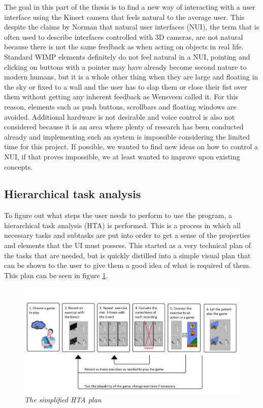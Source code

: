 The goal in this part of the thesis is to find a new way of interacting with a user interface using the Kinect camera that feels natural to the average user. This despite the claims by Norman \cite{Norman2010} that natural user interfaces (NUI), the term that is often used to describe interfaces controlled with 3D cameras, are not natural because there is not the same feedback as when acting on objects in real life. Standard WIMP elements definitely do not feel natural in a NUI, pointing and clicking on buttons with a pointer may have already become second nature to modern humans, but it is a whole other thing when they are large and floating in the sky or fixed to a wall and the user has to slap them or close their fist over them without getting any inherent feedback as Wensveen \cite{Wensveen2004} called it. For this reason, elements such as push buttons, scrollbars and floating windows are avoided. Additional hardware is not desirable and voice control is also not considered because it is an area where plenty of research has been conducted already and implementing such an system is impossible considering the limited time for this project. If possible, we wanted to find new ideas on how to control a NUI, if that proves impossible, we at least wanted to improve upon existing concepts.\\


\subsection{Hierarchical task analysis}

To figure out what steps the user needs to perform to use the program, a hierarchical task analysis (HTA) is performed. This is a process in which all necessary tasks and subtasks are put into order to get a sense of the properties and elements that the UI must possess. This started as a very technical plan of the tasks that are needed, but is quickly distilled into a simple visual plan that can be shown to the user to give them a good idea of what is required of them. This plan can be seen in figure \ref{HTA}.\\

\begin{figure}[H]
	\begin{center}
		\includegraphics[width=14cm]{figures/HTA_plan.png}
		\caption{\emph{The simplified HTA plan}}
		\label{HTA}
	\end{center}
\end{figure}


